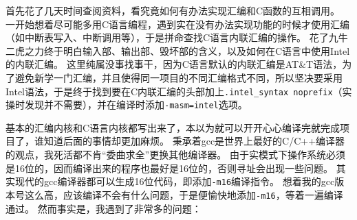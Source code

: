 \documentclass[logo,reportComp]{thesis}
\begin{document}
首先花了几天时间查阅资料，看究竟如何有办法实现汇编和C函数的互相调用。
一开始想着尽可能多用C语言编程，遇到实在没有办法实现功能的时候才使用汇编（如中断表写入、中断调用等），于是拼命查找C语言内联汇编的操作。
花了九牛二虎之力终于明白输入部、输出部、毁坏部的含义，以及如何在C语言中使用Intel的内联汇编。
这里纯属没事找事干，因为C语言默认的内联汇编是AT\&T语法，为了避免新学一门汇编，并且使得同一项目的不同汇编格式不同，所以坚决要采用Intel语法，于是终于找到要在C内联汇编的头部加上\verb'.intel_syntax noprefix'（实操时发现并不需要），并在编译时添加\verb'-masm=intel'选项。

基本的汇编内核和C语言内核都写出来了，本以为就可以开开心心编译完就完成项目了，谁知道后面的事情却更加麻烦。
秉承着gcc是世界上最好的C/C++编译器的观点，我死活都不肯``委曲求全''更换其他编译器。
由于实模式下操作系统必须是16位的，因而编译出来的程序也最好是16位的，否则寻址会出现一些问题。
其实现代的gcc编译器都可以生成16位代码，即添加\verb'-m16'编译指令。
想着我的gcc版本号这么高，应该编译不会有什么问题，于是便愉快地添加\verb'-m16'，等着一遍编译通过。
然而事实是，我遇到了非常多的问题：
\end{document}
